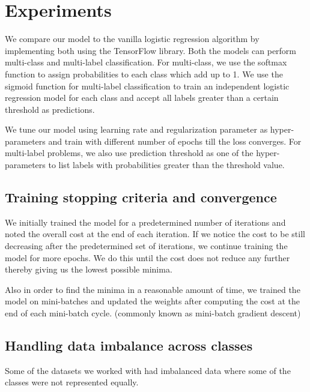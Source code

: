 \newpage
\chapter{Experiments}


We compare our model to the vanilla logistic regression algorithm by implementing both using the TensorFlow library. Both the models can perform multi-class and multi-label classification. For multi-class, we use the softmax function to assign probabilities to each class which add up to 1. We use the sigmoid function for multi-label classification to train an independent logistic regression model for each class and accept all labels greater than a certain threshold as predictions.

We tune our model using learning rate and regularization parameter as hyper-parameters and train with different number of epochs till the loss converges. For multi-label problems, we also use prediction threshold as one of the hyper-parameters to list labels with probabilities greater than the threshold value.

\section{Training stopping criteria and convergence}

We initially trained the model for a predetermined number of iterations and noted the overall cost at the end of each iteration. If we notice the cost to be still decreasing after the predetermined set of iterations, we continue training the model for more epochs. We do this until the cost does not reduce any further thereby giving us the lowest possible minima.

Also in order to find the minima in a reasonable amount of time, we trained the model on mini-batches and updated the weights after computing the cost at the end of each mini-batch cycle. (commonly known as mini-batch gradient descent)

\section{Handling data imbalance across classes}

Some of the datasets we worked with had imbalanced data where some of the classes were not represented equally. 

